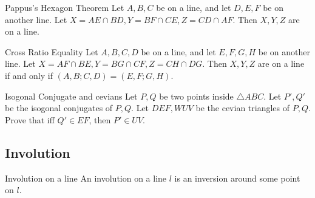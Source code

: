 \vspace{-4em}
\begin{minipage}{.5\linewidth}
    \theo{}
    {Pappus's Hexagon Theorem}{
        Let $ A,B,C $ be on a line, and let $ D,E,F $ be on another line. Let
        $ X=AE\cap BD,Y=BF\cap CE,Z=CD\cap AF $. Then $ X,Y,Z $ are on a line.
    }


    \vspace{-2em}

    \theo{}
    {Cross Ratio Equality}{
        Let $ A,B,C,D $ be on a line, and let $ E,F,G,H $ be on another line.
        Let $X=AF\cap BE, Y=BG\cap CF, Z=CH\cap DG$. Then $ X,Y,Z $ are on a
        line if and only if $ (A,B;C,D) = (E,F;G,H) $.
    }	

    \vspace{2em}

    \prob{}
    {Isogonal Conjugate and cevians}{}{
        Let $P, Q$ be two points inside $\triangle ABC$. Let $P', Q'$ be the
        isogonal conjugates of $P, Q$. Let $DEF, WUV$ be the
        cevian triangles of $P, Q$. Prove that iff $Q'\in EF$, then $P'\in
        UV$.
    }
\end{minipage}\hfill%
\begin{minipage}{.47\linewidth}
    \vspace{5em}
    \vspace{2em}
\end{minipage}



\newpage
\subsection{Involution}

\theo{}
{Involution on a line}{
    An involution on a line $ l $ is an inversion around some point on $ l $.
}




